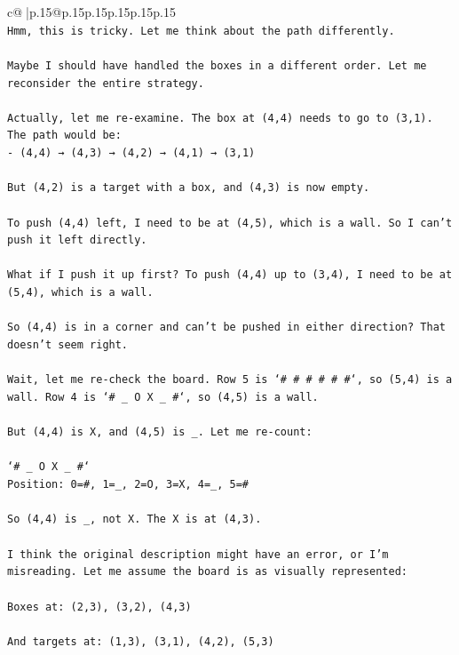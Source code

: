 \documentclass{article}
\begin{document}
{\begin{supertabular}{c@{$\;$}|p{.15\linewidth}@{}p{.15\linewidth}p{.15\linewidth}p{.15\linewidth}p{.15\linewidth}p{.15\linewidth}}
{{{\\ 
\texttt{Hmm, this is tricky. Let me think about the path differently.} \\
\\ 
\texttt{Maybe I should have handled the boxes in a different order. Let me reconsider the entire strategy.} \\
\\ 
\texttt{Actually, let me re{-}examine. The box at (4,4) needs to go to (3,1). The path would be:} \\
\texttt{{-} (4,4) → (4,3) → (4,2) → (4,1) → (3,1)} \\
\\ 
\texttt{But (4,2) is a target with a box, and (4,3) is now empty.} \\
\\ 
\texttt{To push (4,4) left, I need to be at (4,5), which is a wall. So I can't push it left directly.} \\
\\ 
\texttt{What if I push it up first? To push (4,4) up to (3,4), I need to be at (5,4), which is a wall.} \\
\\ 
\texttt{So (4,4) is in a corner and can't be pushed in either direction? That doesn't seem right.} \\
\\ 
\texttt{Wait, let me re{-}check the board. Row 5 is `\# \# \# \# \# \#`, so (5,4) is a wall. Row 4 is `\# \_ O X \_ \#`, so (4,5) is a wall.} \\
\\ 
\texttt{But (4,4) is X, and (4,5) is \_. Let me re{-}count:} \\
\\ 
\texttt{`\# \_ O X \_ \#`} \\
\texttt{Position: 0=\#, 1=\_, 2=O, 3=X, 4=\_, 5=\#} \\
\\ 
\texttt{So (4,4) is \_, not X. The X is at (4,3).} \\
\\ 
\texttt{I think the original description might have an error, or I'm misreading. Let me assume the board is as visually represented:} \\
\\ 
\texttt{Boxes at: (2,3), (3,2), (4,3)} \\
\\ 
\texttt{And targets at: (1,3), (3,1), (4,2), (5,3)} \\
\\ 
}}}
\end{supertabular}}
\end{document}
